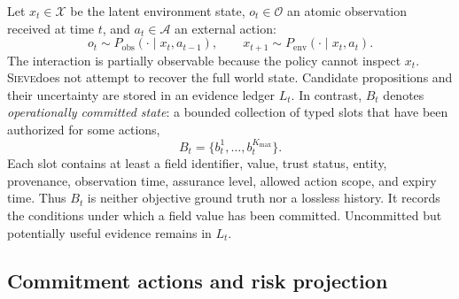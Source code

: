 \documentclass{article}
\newcommand{\method}{\textsc{Sieve}}
\begin{document}
Let $x_t\in\mathcal X$ be the latent environment state, $o_t\in\mathcal O$ an atomic observation received at time $t$, and $a_t\in\mathcal A$ an external action:
\begin{equation}
o_t\sim P_{\mathrm{obs}}(\cdot\mid x_t,a_{t-1}),\qquad
x_{t+1}\sim P_{\mathrm{env}}(\cdot\mid x_t,a_t).
\end{equation}
The interaction is partially observable because the policy cannot inspect $x_t$. \method does not attempt to recover the full world state. Candidate propositions and their uncertainty are stored in an evidence ledger $L_t$. In contrast, $B_t$ denotes \emph{operationally committed state}: a bounded collection of typed slots that have been authorized for some actions,
\begin{equation}
B_t=\{b_t^1,\ldots,b_t^{K_{\max}}\}.
\end{equation}
Each slot contains at least a field identifier, value, trust status, entity, provenance, observation time, assurance level, allowed action scope, and expiry time. Thus $B_t$ is neither objective ground truth nor a lossless history. It records the conditions under which a field value has been committed. Uncommitted but potentially useful evidence remains in $L_t$.

\subsection{Commitment actions and risk projection}
\end{document}
